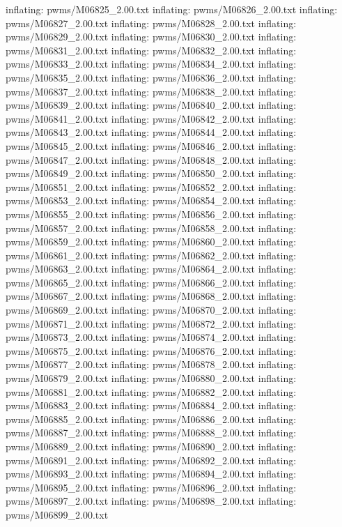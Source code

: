 \documentclass[letterpaper,10pt,english]{sphinxmanual}
\begin{document}
{\begin{sphinxVerbatim}[commandchars=\\\{\}]
  inflating: pwms/M06825\_2.00.txt
  inflating: pwms/M06826\_2.00.txt
  inflating: pwms/M06827\_2.00.txt
  inflating: pwms/M06828\_2.00.txt
  inflating: pwms/M06829\_2.00.txt
  inflating: pwms/M06830\_2.00.txt
  inflating: pwms/M06831\_2.00.txt
  inflating: pwms/M06832\_2.00.txt
  inflating: pwms/M06833\_2.00.txt
  inflating: pwms/M06834\_2.00.txt
  inflating: pwms/M06835\_2.00.txt
  inflating: pwms/M06836\_2.00.txt
  inflating: pwms/M06837\_2.00.txt
  inflating: pwms/M06838\_2.00.txt
  inflating: pwms/M06839\_2.00.txt
  inflating: pwms/M06840\_2.00.txt
  inflating: pwms/M06841\_2.00.txt
  inflating: pwms/M06842\_2.00.txt
  inflating: pwms/M06843\_2.00.txt
  inflating: pwms/M06844\_2.00.txt
  inflating: pwms/M06845\_2.00.txt
  inflating: pwms/M06846\_2.00.txt
  inflating: pwms/M06847\_2.00.txt
  inflating: pwms/M06848\_2.00.txt
  inflating: pwms/M06849\_2.00.txt
  inflating: pwms/M06850\_2.00.txt
  inflating: pwms/M06851\_2.00.txt
  inflating: pwms/M06852\_2.00.txt
  inflating: pwms/M06853\_2.00.txt
  inflating: pwms/M06854\_2.00.txt
  inflating: pwms/M06855\_2.00.txt
  inflating: pwms/M06856\_2.00.txt
  inflating: pwms/M06857\_2.00.txt
  inflating: pwms/M06858\_2.00.txt
  inflating: pwms/M06859\_2.00.txt
  inflating: pwms/M06860\_2.00.txt
  inflating: pwms/M06861\_2.00.txt
  inflating: pwms/M06862\_2.00.txt
  inflating: pwms/M06863\_2.00.txt
  inflating: pwms/M06864\_2.00.txt
  inflating: pwms/M06865\_2.00.txt
  inflating: pwms/M06866\_2.00.txt
  inflating: pwms/M06867\_2.00.txt
  inflating: pwms/M06868\_2.00.txt
  inflating: pwms/M06869\_2.00.txt
  inflating: pwms/M06870\_2.00.txt
  inflating: pwms/M06871\_2.00.txt
  inflating: pwms/M06872\_2.00.txt
  inflating: pwms/M06873\_2.00.txt
  inflating: pwms/M06874\_2.00.txt
  inflating: pwms/M06875\_2.00.txt
  inflating: pwms/M06876\_2.00.txt
  inflating: pwms/M06877\_2.00.txt
  inflating: pwms/M06878\_2.00.txt
  inflating: pwms/M06879\_2.00.txt
  inflating: pwms/M06880\_2.00.txt
  inflating: pwms/M06881\_2.00.txt
  inflating: pwms/M06882\_2.00.txt
  inflating: pwms/M06883\_2.00.txt
  inflating: pwms/M06884\_2.00.txt
  inflating: pwms/M06885\_2.00.txt
  inflating: pwms/M06886\_2.00.txt
  inflating: pwms/M06887\_2.00.txt
  inflating: pwms/M06888\_2.00.txt
  inflating: pwms/M06889\_2.00.txt
  inflating: pwms/M06890\_2.00.txt
  inflating: pwms/M06891\_2.00.txt
  inflating: pwms/M06892\_2.00.txt
  inflating: pwms/M06893\_2.00.txt
  inflating: pwms/M06894\_2.00.txt
  inflating: pwms/M06895\_2.00.txt
  inflating: pwms/M06896\_2.00.txt
  inflating: pwms/M06897\_2.00.txt
  inflating: pwms/M06898\_2.00.txt
  inflating: pwms/M06899\_2.00.txt

\end{sphinxVerbatim}}
\end{document}

